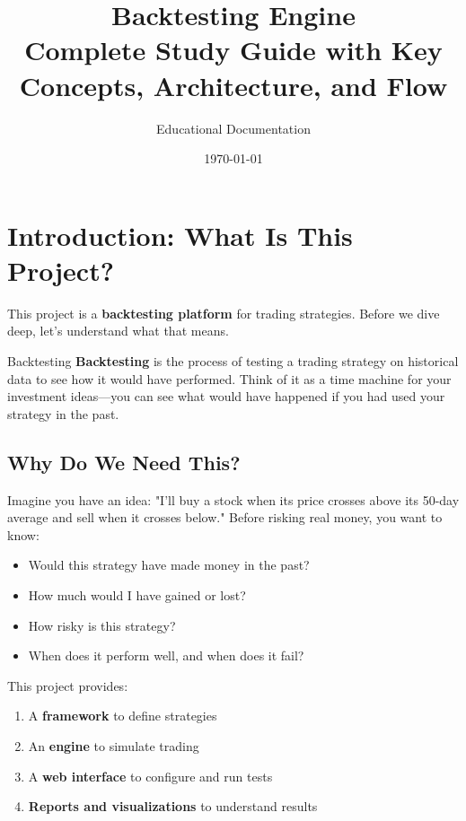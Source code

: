 \documentclass[11pt,a4paper]{article}
\title{%
  \textbf{Backtesting Engine}\\
  \large Complete Study Guide with Key Concepts, Architecture, and Flow
}
\author{Educational Documentation}
\date{\today}
\begin{document}
\maketitle
\tableofcontents
\clearpage

\section{Introduction: What Is This Project?}

This project is a \textbf{backtesting platform} for trading strategies. Before we dive deep, let's understand what that means.

\begin{keyterm}{Backtesting}
\textbf{Backtesting} is the process of testing a trading strategy on historical data to see how it would have performed. Think of it as a time machine for your investment ideas—you can see what would have happened if you had used your strategy in the past.
\end{keyterm}

\subsection{Why Do We Need This?}

Imagine you have an idea: "I'll buy a stock when its price crosses above its 50-day average and sell when it crosses below." Before risking real money, you want to know:
\begin{itemize}
  \item Would this strategy have made money in the past?
  \item How much would I have gained or lost?
  \item How risky is this strategy?
  \item When does it perform well, and when does it fail?
\end{itemize}

This project provides:
\begin{enumerate}
  \item A \textbf{framework} to define strategies
  \item An \textbf{engine} to simulate trading
  \item A \textbf{web interface} to configure and run tests
  \item \textbf{Reports and visualizations} to understand results
\end{enumerate}
\end{document}
